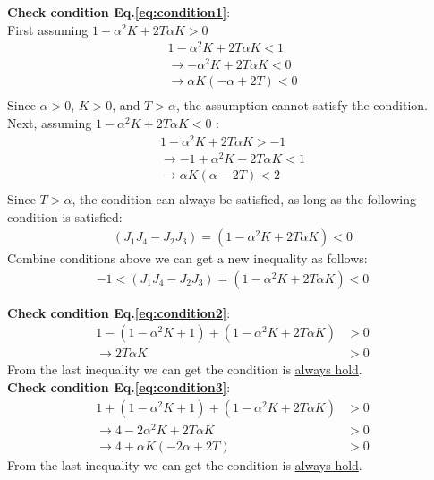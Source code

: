 \noindent \textbf{Check condition Eq.\ref{eq:condition1}}:\\
First assuming $1-\alpha^2K+2T\alpha K>0$ 
\begin{align*}
1-\alpha^2K+2T\alpha K <1\\
\rightarrow -\alpha^2K+2T\alpha K < 0\\
\rightarrow \alpha K(-\alpha + 2T) < 0\\
\end{align*}
Since $\alpha>0$, $K>0$, and $T>\alpha$, the assumption cannot satisfy the condition.\\ Next, assuming $1-\alpha^2K+2T\alpha K<0$ :
\begin{align*}
1-\alpha^2K+2T\alpha K >-1\\
\rightarrow -1+\alpha^2K-2T\alpha K < 1\\
\rightarrow \alpha K(\alpha - 2T) < 2\\
\end{align*}
Since $T>\alpha$, the condition can always be satisfied, as long as the following condition is satisfied:
\begin{align*}
(J_1J_4-J_2J_3) = (1-\alpha^2K+2T\alpha K) <0
 \end{align*}
Combine conditions above we can get a new inequality as follows:
\begin{align}
\label{iq:detM}
-1< (J_1J_4-J_2J_3) = (1-\alpha^2K+2T\alpha K)  <0
 \end{align}


\noindent \textbf{Check condition Eq.\ref{eq:condition2}}:\\
\begin{align*}
1-(1-\alpha^2K+ 1) + (1-\alpha^2K+2T\alpha K)&>0\\
\rightarrow 2T\alpha K&>0 
\end{align*}
From the last inequality we can get the condition is \underline{always hold}.\\

\noindent \textbf{Check condition Eq.\ref{eq:condition3}}:\\
\begin{align*}
1  + (1-\alpha^2K+ 1) + (1-\alpha^2K+2T\alpha K) &>0 \\
\rightarrow 4-2 \alpha^2K+ 2T\alpha K &> 0\\
\rightarrow 4 + \alpha K(-2\alpha+ 2T) &> 0
\end{align*}
From the last inequality we can get the condition is \underline{always hold}.\\

